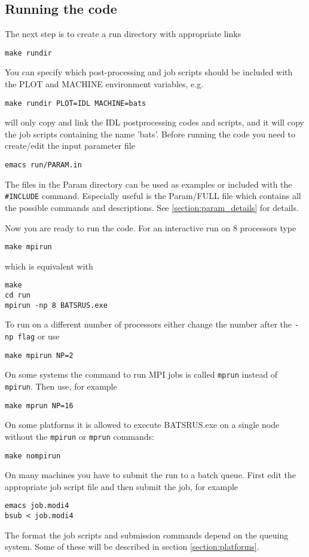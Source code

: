 \subsection{Running the code}

The next step is to create a run directory with appropriate links
\begin{verbatim}
make rundir
\end{verbatim}
You can specify which post-processing and job scripts should be
included with the PLOT and MACHINE environment variables, e.g.
\begin{verbatim}
make rundir PLOT=IDL MACHINE=bats
\end{verbatim}
will only copy and link the IDL postprocessing codes and scripts,
and it will copy the job scripts containing the name 'bats'.
Before running the code you need to create/edit the input
parameter file
\begin{verbatim}
emacs run/PARAM.in
\end{verbatim}
The files in the Param directory can be used as examples or included
with the {\tt \#INCLUDE} command.
Especially useful is the Param/FULL file which contains
all the possible commands and descriptions.
See \ref{section:param_details} for details.

Now you are ready to run the code. For an interactive run
on 8 processors type
\begin{verbatim}
make mpirun
\end{verbatim}
which is equivalent with
\begin{verbatim}
make
cd run
mpirun -np 8 BATSRUS.exe
\end{verbatim}
To run on a different number of processors either change the number
after the {\tt -np flag} or use
\begin{verbatim}
make mpirun NP=2
\end{verbatim}
On some systems the command to run MPI jobs is called {\tt mprun}
instead of {\tt mpirun}. Then use, for example
\begin{verbatim}
make mprun NP=16
\end{verbatim}
On some platforms it is allowed to execute BATSRUS.exe on a single node 
without the {\tt mpirun} or {\tt mprun} commands:
\begin{verbatim}
make nompirun
\end{verbatim}
On many machines you have to submit the run to a batch queue.
First edit the appropriate job script file and then submit the job,
for example
\begin{verbatim}
emacs job.modi4 
bsub < job.modi4 
\end{verbatim}
The format the job scripts and submission commands depend on
the queuing system. Some of these will be described in 
section \ref{section:platforms}.


